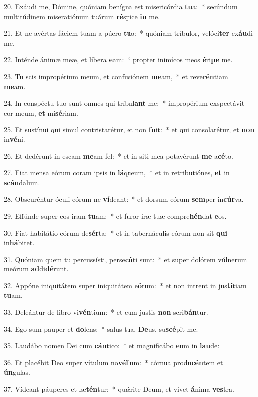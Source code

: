 20. Exáudi me, Dómine, quóniam benígna est misericórdia \textbf{tu}a:~*  secúndum multitúdinem miseratiónum tuárum \textbf{ré}spice \textbf{in} me.\

21. Et ne avértas fáciem tuam a púero \textbf{tu}o:~*  quóniam tríbulor, velóci\textbf{ter} ex\textbf{áu}di me.\

22. Inténde ánimæ meæ, et líbera \textbf{e}am:~*  propter inimícos meos \textbf{é}ri\textbf{pe} me.\

23. Tu scis impropérium meum, et confusiónem \textbf{me}am,~*  et reve\textbf{rén}tiam \textbf{me}am.\

24. In conspéctu tuo sunt omnes qui tríbu\textbf{lant} me:~*  impropérium exspectávit cor meum, \textbf{et} mi\textbf{sé}riam.\

25. Et sustínui qui simul contristarétur, et non \textbf{fu}it:~*  et qui consolarétur, et \textbf{non} in\textbf{vé}ni.\

26. Et dedérunt in escam \textbf{me}am fel:~*  et in siti mea potavérunt \textbf{me} a\textbf{cé}to.\

27. Fiat mensa eórum coram ipsis in \textbf{lá}queum,~*  et in retributiónes, \textbf{et} in \textbf{scán}dalum.\

28. Obscuréntur óculi eórum ne \textbf{ví}deant:~*  et dorsum eórum \textbf{sem}per in\textbf{cúr}va.\

29. Effúnde super eos iram \textbf{tu}am:~*  et furor iræ tuæ compre\textbf{hén}dat \textbf{e}os.\

30. Fiat habitátio eórum de\textbf{sér}ta:~*  et in tabernáculis eórum non sit \textbf{qui} in\textbf{há}bitet.\

31. Quóniam quem tu percussísti, perse\textbf{cú}ti sunt:~*  et super dolórem vúlnerum meórum \textbf{ad}di\textbf{dé}runt.\

32. Appóne iniquitátem super iniquitátem e\textbf{ó}rum:~*  et non intrent in jus\textbf{tí}tiam \textbf{tu}am.\

33. Deleántur de libro vi\textbf{vén}tium:~*  et cum justis \textbf{non} scri\textbf{bán}tur.\

34. Ego sum pauper et \textbf{do}lens:~*  salus tua, \textbf{De}us, su\textbf{scé}pit me.\

35. Laudábo nomen Dei cum \textbf{cán}tico:~*  et magnificábo \textbf{e}um in \textbf{lau}de:\

36. Et placébit Deo super vítulum no\textbf{vél}lum:~*  córnua produ\textbf{cén}tem et \textbf{ún}gulas.\

37. Vídeant páuperes et læ\textbf{tén}tur:~*  quǽrite Deum, et vivet \textbf{á}nima \textbf{ves}tra.\

